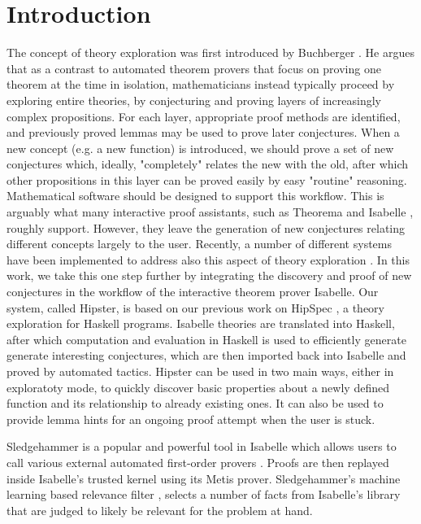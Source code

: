 \section{Introduction}
\label{sec:intro}
The concept of theory exploration was first introduced by Buchberger \cite{buchberger2000theory}. He argues that as a contrast to  automated theorem provers that focus on proving one theorem at the time in isolation, mathematicians instead typically proceed by exploring entire theories, by conjecturing and proving layers of increasingly complex propositions. For each layer, appropriate proof methods are identified, and previously proved lemmas may be used to prove later conjectures. When a new concept (e.g. a new function) is introduced, we should prove a set of new conjectures which, ideally, "completely" relates the new with the old, after which other propositions in this layer can be proved easily by easy "routine" reasoning. Mathematical software should be designed to support this workflow. This is arguably what many interactive proof assistants, such as Theorema \cite{theorema} and Isabelle \cite{isabelle}, roughly support. However, they leave the generation of new conjectures relating different concepts largely to the user. Recently, a number of different systems have been implemented to address also this aspect of theory exploration \cite{McCasland2006,isacosy,isascheme,hipspecCADE}.  In this work, we take this one step further by integrating the discovery and proof of new conjectures in the workflow of the interactive theorem prover Isabelle. Our system, called Hipster, is based on our previous work on HipSpec \cite{hipspecCADE}, a theory exploration for Haskell programs. Isabelle theories are translated into Haskell, after which computation and evaluation in Haskell is used to efficiently generate generate interesting conjectures, which are then imported back into Isabelle and proved by automated tactics. Hipster can be used in two main ways, either in exploratoty mode, to quickly discover basic properties about a newly defined function and its relationship to already existing ones. It can also be used to provide lemma hints for an ongoing proof attempt when the user is stuck. 


Sledgehammer is a popular and powerful tool in Isabelle which allows users to call various external automated first-order provers \cite{sledgehammer}. Proofs are then replayed inside Isabelle's trusted kernel using its Metis prover. Sledgehammer's machine learning based relevance filter \cite{mash}, selects a number of facts from Isabelle's library that are judged to likely be relevant for the problem at hand. 
 
